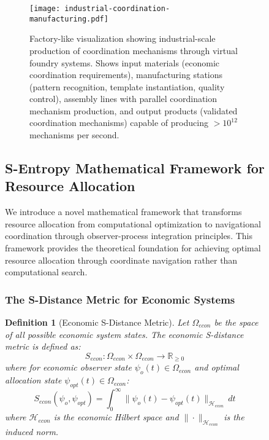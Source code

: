 \documentclass[12pt,a4paper]{article}
\newtheorem{definition}[theorem]{Definition}
\begin{document}
\begin{figure}[H]
\begin{figure}[H]
\centering
\texttt{[image: industrial-coordination-manufacturing.pdf]}
\caption{Factory-like visualization showing industrial-scale production of coordination mechanisms through virtual foundry systems. Shows input materials (economic coordination requirements), manufacturing stations (pattern recognition, template instantiation, quality control), assembly lines with parallel coordination mechanism production, and output products (validated coordination mechanisms) capable of producing $>10^{12}$ mechanisms per second.}
\label{fig:industrial-coordination-manufacturing}
\end{figure}

\subsection{S-Entropy Mathematical Framework for Resource Allocation}

We introduce a novel mathematical framework that transforms resource allocation from computational optimization to navigational coordination through observer-process integration principles. This framework provides the theoretical foundation for achieving optimal resource allocation through coordinate navigation rather than computational search.

\subsubsection{The S-Distance Metric for Economic Systems}

\begin{definition}[Economic S-Distance Metric]
Let $\Omega_{econ}$ be the space of all possible economic system states. The economic S-distance metric is defined as:
\begin{equation}
S_{econ}: \Omega_{econ} \times \Omega_{econ} \to \mathbb{R}_{\geq 0}
\end{equation}
where for economic observer state $\psi_o(t) \in \Omega_{econ}$ and optimal allocation state $\psi_{opt}(t) \in \Omega_{econ}$:
\begin{equation}
S_{econ}(\psi_o, \psi_{opt}) = \int_0^{\infty} \|\psi_o(t) - \psi_{opt}(t)\|_{\mathcal{H}_{econ}} \, dt
\end{equation}
where $\mathcal{H}_{econ}$ is the economic Hilbert space and $\|\cdot\|_{\mathcal{H}_{econ}}$ is the induced norm.
\end{definition}


\end{figure}
\end{document}
